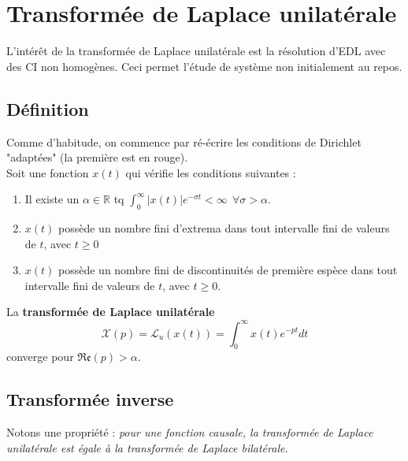 	
	
\section{Transformée de Laplace unilatérale}
L'intérêt de la transformée de Laplace unilatérale est la résolution d'EDL avec des CI non homogènes.
Ceci permet l'étude de système non initialement au repos.
	
\subsection{Définition}
Comme d'habitude, on commence par ré-écrire les conditions de Dirichlet "adaptées" (la première
est en rouge).\\
Soit une fonction $x(t)$ qui vérifie les conditions suivantes :
\begin{enumerate}
	\item Il existe un $\alpha \in \mathbb{R}$ tq $\int_0^\infty |x(t)|e^{-\sigma t} < \infty\ \ 
	      \forall \sigma > \alpha$.
	\item $x(t)$ possède un nombre fini d'extrema dans tout intervalle fini de valeurs de $t$, avec
	      $t\geq 0$
	\item $x(t)$ possède un nombre fini de discontinuités de première espèce dans tout intervalle
	      fini de valeurs de $t$, avec $t\geq 0$.
\end{enumerate}
La \textbf{transformée de Laplace unilatérale}
\begin{equation}
	\mathcal{X}(p) = \mathcal{L}_u(x(t)) = \int_0^\infty x(t)e^{-pt}dt
\end{equation}
converge pour $\mathfrak{Re}(p)>\alpha$.
	
\subsection{Transformée inverse}
	
Notons une propriété : \textit{pour une fonction causale, la transformée de Laplace unilatérale  
est	égale à la transformée de Laplace bilatérale.}
	
